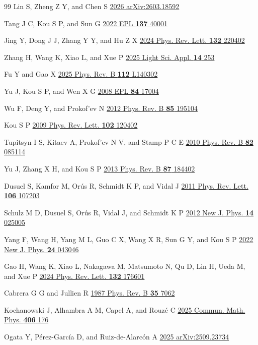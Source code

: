 \documentclass[aps,prb,floatfix,superscriptaddress,reprint]{revtex4-2}
\begin{document}
\begin{thebibliography}{99}
Lin S, Zheng Z Y, and Chen S \href{https://arxiv.org/abs/2603.18592}{2026 arXiv:2603.18592}

Tang J C, Kou S P, and Sun G \href{https://doi.org/10.1209/0295-5075/ac53c4}{2022 EPL \textbf{137} 40001}

Jing Y, Dong J J, Zhang Y Y, and Hu Z X \href{https://doi.org/10.1103/PhysRevLett.132.220402}{2024 Phys. Rev. Lett. \textbf{132} 220402}

Zhang H, Wang K, Xiao L, and Xue P \href{https://doi.org/10.1038/s41377-025-01919-6}{2025 Light Sci. Appl. \textbf{14} 253}

Fu Y and Gao X \href{https://doi.org/10.1103/92w1-71rt}{2025 Phys. Rev. B \textbf{112} L140302}

Yu J, Kou S P, and Wen X G \href{https://doi.org/10.1209/0295-5075/84/17004}{2008 EPL \textbf{84} 17004}

Wu F, Deng Y, and Prokof'ev N \href{https://doi.org/10.1103/PhysRevB.85.195104}{2012 Phys. Rev. B \textbf{85} 195104}

Kou S P \href{https://doi.org/10.1103/PhysRevLett.102.120402}{2009 Phys. Rev. Lett. \textbf{102} 120402}

Tupitsyn I S, Kitaev A, Prokof'ev N V, and Stamp P C E \href{https://doi.org/10.1103/PhysRevB.82.085114}{2010 Phys. Rev. B \textbf{82} 085114}

Yu J, Zhang X H, and Kou S P \href{https://doi.org/10.1103/PhysRevB.87.184402}{2013 Phys. Rev. B \textbf{87} 184402}

Dusuel S, Kamfor M, Or\'{u}s R, Schmidt K P, and Vidal J \href{https://doi.org/10.1103/PhysRevLett.106.107203}{2011 Phys. Rev. Lett. \textbf{106} 107203}

Schulz M D, Dusuel S, Or\'{u}s R, Vidal J, and Schmidt K P \href{https://doi.org/10.1088/1367-2630/14/2/025005}{2012 New J. Phys. \textbf{14} 025005}

Yang F, Wang H, Yang M L, Guo C X, Wang X R, Sun G Y, and Kou S P \href{https://iopscience.iop.org/article/10.1088/1367-2630/ac652f}{2022 New J. Phys. \textbf{24} 043046}

Gao H, Wang K, Xiao L, Nakagawa M, Matsumoto N, Qu D, Lin H, Ueda M, and Xue P \href{https://doi.org/10.1103/PhysRevLett.132.176601}{2024 Phys. Rev. Lett. \textbf{132} 176601}

Cabrera G G and Jullien R \href{https://doi.org/10.1103/PhysRevB.35.7062}{1987 Phys. Rev. B \textbf{35} 7062}

Kochanowski J, Alhambra A M, Capel A, and Rouz\'{e} C \href{https://doi.org/10.1007/s00220-025-05353-y}{2025 Commun. Math. Phys. \textbf{406} 176}

Ogata Y, P\'{e}rez-Garc\'{i}a D, and Ruiz-de-Alarc\'{o}n A \href{https://arxiv.org/abs/2509.23734}{2025 arXiv:2509.23734}

\end{thebibliography}
\end{document}
